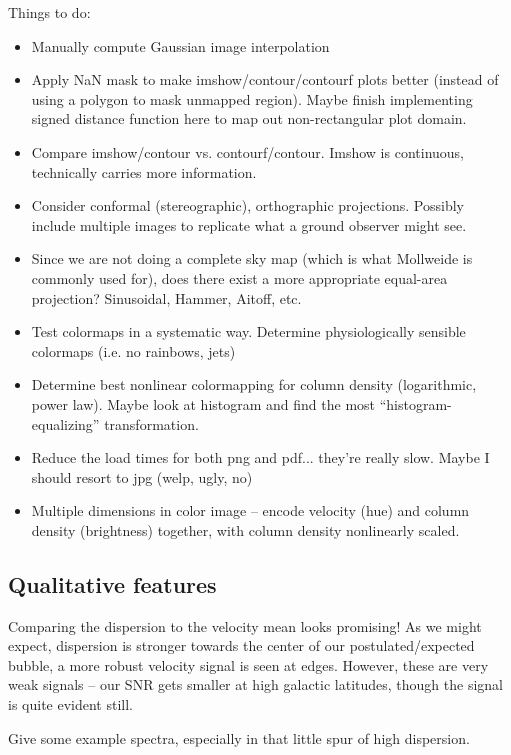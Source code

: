 \documentclass[10pt]{article}
\begin{document}
Things to do:
\begin{itemize}
    \item Manually compute Gaussian image interpolation
    \item Apply NaN mask to make imshow/contour/contourf plots better (instead of using a polygon to mask unmapped region).  Maybe finish implementing signed distance function here to map out non-rectangular plot domain.
    \item Compare imshow/contour vs. contourf/contour.  Imshow is continuous, technically carries more information.
    \item Consider conformal (stereographic), orthographic projections.    Possibly include multiple images to replicate what a ground observer might see.
    \item Since we are not doing a complete sky map (which is what Mollweide is commonly used for), does there exist a more appropriate equal-area projection? Sinusoidal, Hammer, Aitoff, etc.
    \item Test colormaps in a systematic way.  Determine physiologically sensible colormaps (i.e. no rainbows, jets)
    \item Determine best nonlinear colormapping for column density (logarithmic, power law).  Maybe look at histogram and find the most ``histogram-equalizing'' transformation.
    \item Reduce the load times for both png and pdf... they're really slow.  Maybe I should resort to jpg (welp, ugly, no)
    \item Multiple dimensions in color image -- encode velocity (hue) and column density (brightness) together, with column density nonlinearly scaled.
\end{itemize}

\subsection{Qualitative features}

Comparing the dispersion to the velocity mean looks promising!  As we might expect, dispersion is stronger towards the center of our postulated/expected bubble, a more robust velocity signal is seen at edges.  However, these are very weak signals -- our SNR gets smaller at high galactic latitudes, though the signal is quite evident still.

Give some example spectra, especially in that little spur of high dispersion.

\end{document}
